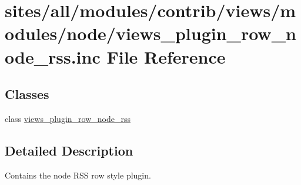 \hypertarget{views__plugin__row__node__rss_8inc}{
\section{sites/all/modules/contrib/views/modules/node/views\_\-plugin\_\-row\_\-node\_\-rss.inc File Reference}
\label{views__plugin__row__node__rss_8inc}
}
\subsection*{Classes}
\begin{CompactItemize}
\item 
class \hyperlink{classviews__plugin__row__node__rss}{views\_\-plugin\_\-row\_\-node\_\-rss}
\end{CompactItemize}


\subsection{Detailed Description}
Contains the node RSS row style plugin. 